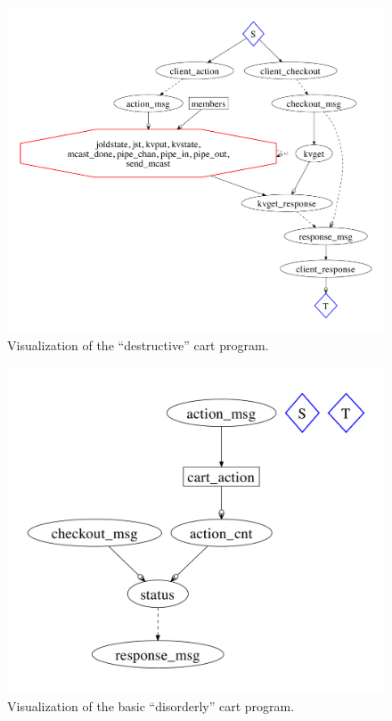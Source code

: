 \begin{figure}[t]
\centering
\includegraphics[width=1.1\linewidth]{fig/destructive_kvs.pdf}
\vspace{-10pt}
\caption{Visualization of the ``destructive'' cart program.  }
\label{fig:pdg-destructive-kvs-analysis}
\vspace{-2pt}
\end{figure}

\begin{figure}[t]
\centering
\includegraphics[width=0.8\linewidth]{fig/disorderly_base.pdf}
\vspace{-10pt}
\caption{Visualization of the basic ``disorderly'' cart program.}
\label{fig:pdg-disorderly-base}
\vspace{-2pt}
\end{figure}

